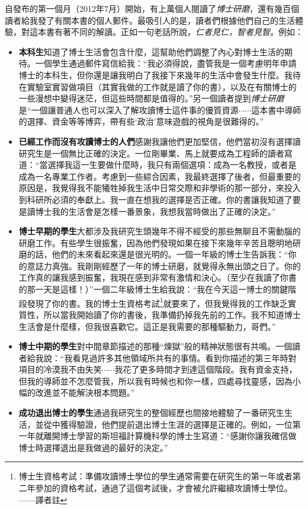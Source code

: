 \documentclass[12pt,UTF8,nofonts]{book}
\newcommand{\bookname}{博士研磨}
\begin{document}
自發布的第一個月（2012年7月）開始，有上萬個人閱讀了\emph{\bookname}，還有幾百個讀者給我發了有關本書的個人郵件。最吸引人的是，讀者們根據他們自己的生活體驗，對這本書有著不同的解讀。正如一句老話所說，\emph{仁者見仁，智者見智}。例如：
\begin{itemize}
  \item \textbf{本科生}知道了博士生活會包含什麼，這幫助他們調整了內心對博士生活的期待。一個學生通過郵件寫信給我：“我必須得說，盡管我是一個考慮明年申請博士的本科生，但你還是讓我明白了我接下來幾年的生活中會發生什麼。我待在實驗室實習做項目（其實我做的工作就是讀了你的書），以及在有關博士的一些漫想中變得迷茫，但這些時間都是值得的。”另一個讀者提到\emph{\bookname}是“一個讓普通人也可以深入了解攻讀博士這件事的優質資源$\cdots\cdots$這本書中導師的選擇、資金等等博弈，帶有些‘政治’意味遊戲的視角是很難得的。”
  \item \textbf{已經工作而沒有攻讀博士的人們}感謝我讓他們更加堅信，他們當初沒有選擇讀研究生是一個無比正確的決定。一位剛畢業、馬上就要成為工程師的讀者寫道：“當選擇我這一生要做什麼時，我只有兩個選項：成為一名教授，或者是成為一名專業工作者。考慮到一些綜合因素，我最終選擇了後者，但最重要的原因是，我覺得我不能犧牲掉我生活中日常交際和非學術的那一部分，來投入到科研所必須的奉獻上。我一直在想我的選擇是否正確。你的書讓我知道了要是讀博士我的生活會是怎樣一番景象，我想我當時做出了正確的決定。”
  \item \textbf{博士早期的學生}大都涉及我研究生頭幾年不得不經受的那些無聊且不需動腦的研磨工作。有些學生很振奮，因為他們發現如果在接下來幾年辛苦且聰明地研磨的話，他們的未來看起來還是很光明的。一個一年級的博士生告訴我：“你的意誌力真強。我剛剛經歷了一年的博士研磨，就覺得永無出頭之日了。你的工作真的讓我感到振奮，我現在感到非常有激情和決心。（至少在我讀了你書的那一天是這樣！）”一個二年級博士生給我說：“我在今天這一博士的關鍵階段發現了你的書。我的博士生資格考試\footnote{博士生資格考試：準備攻讀博士學位的學生通常需要在研究生的第一年或者第二年參加的資格考試，通過了這個考試後，才會被允許繼續攻讀博士學位。——譯者註}就要來了，但我覺得我的工作缺乏實質性，所以當我開始讀了你的書後，我準備扔掉我先前的工作。我不知道博士生活會是什麼樣，但我很喜歡它。這正是我需要的那種驅動力，哥們。”
  \item \textbf{博士中期的學生}對中間章節描述的那種“煉獄”般的精神狀態很有共鳴。一個讀者給我說：“我看見過許多其他領域所共有的事情。看到你描述的第三年時對項目的冷漠我不由失笑$\cdots\cdots$我花了更多時間才到達這個階段。我有資金支持，但我的導師並不怎麼管我，所以我有時候也和你一樣，四處尋找靈感，因為小幅的改進並不能解決根本問題。”
  \item \textbf{成功退出博士的學生}通過我研究生的整個經歷也間接地體驗了一番研究生生活，並從中獲得驗證，他們提前退出博士生涯的選擇是正確的。例如，一位第一年就離開博士學習的斯坦福計算機科學的博士生寫道：“感謝你讓我確信做博士時選擇退出是我做過的最好的決定。”

\end{itemize}
\end{document}
